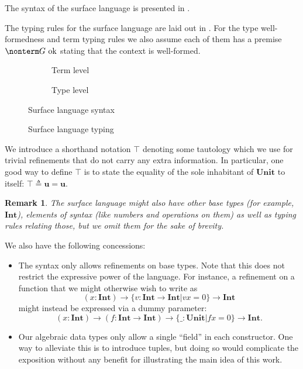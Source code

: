 \documentclass[a4paper]{article}
\newtheorem{remark}{Remark}
\newcommand{\unit}{\textbf{u}}
\newcommand{\Unit}{\textbf{Unit}}
\newcommand{\Int}{\textbf{Int}}
\newcommand{\ctxok}{\text{~ok}}
\begin{document}
The syntax of the surface language is presented in .

The typing rules for the surface language are laid out in .
For the type well-formedness and term typing rules
we also assume each of them has a premise $\nonterm G \ctxok$
stating that the context is well-formed.

\begin{figure}[ht]
  \footnotesize
  \begin{subfigure}{.6\textwidth}
    \caption{Term level}
  \end{subfigure}
  \begin{subfigure}{.5\textwidth}
    \caption{Type level}
  \end{subfigure}
  \caption{Surface language syntax}
  \label{fig:surface_syntax}
\end{figure}

\begin{figure}[ht]
  \footnotesize
  \drules[TCTX]{$\nonterm G \ctxok$}{context well-formedness}{Empty,Bind}
  \caption{Surface language typing}
  \label{fig:surface_typing}
\end{figure}

We introduce a shorthand notation $\top$ denoting some tautology
which we use for trivial refinements that do not carry any extra information.
In particular, one good way to define $\top$ is
to state the equality of the sole inhabitant of $\Unit$ to itself:
$\top \triangleq \unit = \unit$.

\begin{remark}\label{remark:surface_base_types}
  The surface language might also have other base types (for example, $\Int$),
  elements of syntax (like numbers and operations on them)
  as well as typing rules relating those,
  but we omit them for the sake of brevity.
\end{remark}

We also have the following concessions:
\begin{itemize}
  \item The syntax only allows refinements on base types.
    Note that this does not restrict the expressive power of the language.
    For instance, a refinement on a function that we might otherwise wish to write as
    \[
      (x : \Int) \rightarrow \{ v : \Int \rightarrow \Int | v x = 0 \} \rightarrow \Int
    \]
    might instead be expressed via a dummy parameter:
    \[
      (x : \Int) \rightarrow (f : \Int \rightarrow \Int) \rightarrow \{ \_ : \Unit | f x = 0 \} \rightarrow \Int.
    \]
  \item Our algebraic data types only allow a single ``field'' in each constructor.
    One way to alleviate this is to introduce tuples,
    but doing so would complicate the exposition
    without any benefit for illustrating the main idea of this work.
\end{itemize}
\end{document}
